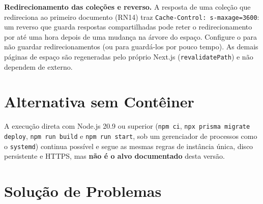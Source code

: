 \textbf{Redirecionamento das coleções e  reverso.} A resposta de uma coleção que redireciona ao primeiro documento (RN14) traz \texttt{Cache-Control: s-maxage=3600}: um  reverso que guarda respostas compartilhadas pode reter o redirecionamento por até uma hora depois de uma mudança na árvore do espaço. Configure o  para não guardar redirecionamentos (ou para guardá-los por pouco tempo). As demais páginas de espaço são regeneradas pelo próprio Next.js (\texttt{revalidatePath}) e não dependem de  externo.

\section{Alternativa sem Contêiner}

A execução direta com Node.js 20.9 ou superior (\texttt{npm ci}, \texttt{npx prisma migrate deploy}, \texttt{npm run build} e \texttt{npm run start}, sob um gerenciador de processos como o \texttt{systemd}) continua possível e segue as mesmas regras de instância única, disco persistente e HTTPS, mas \textbf{não é o alvo documentado} desta versão.

\section{Solução de Problemas}

